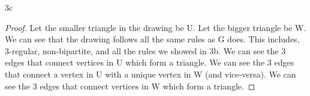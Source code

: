 \documentclass[boxes]{rutgers_hw}
\begin{document}
  \pagebreak

  \begin{exern}{3c}
    
  \end{exern}
  \begin{proof}
    Let the smaller triangle in the drawing be U. Let the bigger triangle be W. 
    We can see that the drawing follows all the same rules as G does.
    This includes, 3-regular, non-bipartite, and all the rules we showed in 3b.
    We can see the 3 edges that connect vertices in U which form a triangle.
    We can see the 3 edges that connect a vertex in U with a unique vertex in W (and vice-versa).
    We can see the 3 edges that connect vertices in W which form a triangle.
  \end{proof}
\end{document}
